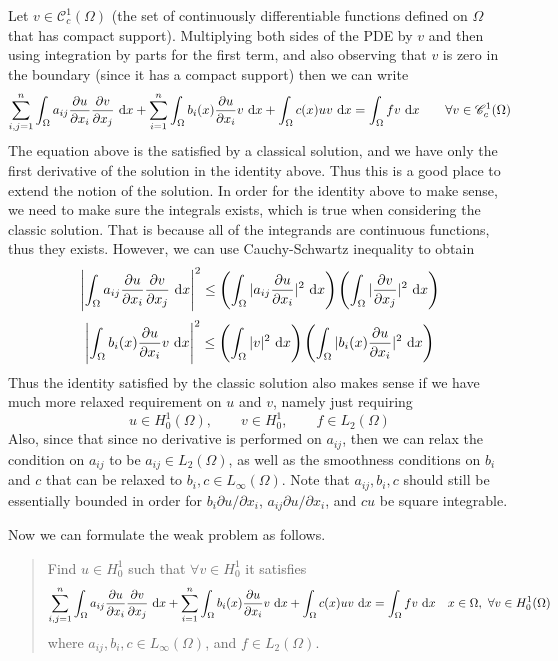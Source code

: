 Let $ v \in \mathscr{C}^1_c(\Omega) $ (the set of continuously differentiable functions defined on $ \Omega $ that has compact support). Multiplying both sides of the PDE by $ v $  and then using integration by parts for the first term, and also observing that $ v $ is zero in the boundary (since it has a compact support) then we can write
\[ \sum_{i,j=1}^{n}\int_\Omega a_{ij}\frac{\partial u}{\partial x_i} \frac{\partial v}{\partial x_j}\, \operatorname{d}\!x +\sum_{i=1}^{n} \int_\Omega b_i(x)\frac{\partial u}{\partial x_i} v\, \operatorname{d}\!x + \int_\Omega c(x) u v\, \operatorname{d}\!x = \int_\Omega fv\, \operatorname{d}\!x \qquad \forall v \in \mathscr{C}^1_c(\Omega) \]
The equation above is the satisfied by a classical solution, and we have only the first derivative of the solution in the identity above. Thus this is a good place to extend the notion of the solution. In order for the identity above to make sense, we need to make sure the integrals exists, which is true when considering the classic solution. That is because all of the integrands are continuous functions, thus they exists. However, we can use Cauchy-Schwartz inequality to obtain
\[\left|  \int_\Omega a_{ij}\frac{\partial u}{\partial x_i} \frac{\partial v}{\partial x_j}\, \operatorname{d}\!x  \right|^2 \leq \left(\int_\Omega |a_{ij}\frac{\partial u}{\partial x_i}|^2\, \operatorname{d}\!x\right)\left(\int_\Omega |\frac{\partial v}{\partial x_j}|^2\, \operatorname{d}\!x\right)\]
\[ \left| \int_\Omega b_i(x)\frac{\partial u}{\partial x_i} v \, \operatorname{d}\!x \right|^2 \leq \left(\int_\Omega |v|^2\, \operatorname{d}\!x\right)\left(\int_\Omega |b_i(x)\frac{\partial u}{\partial x_i}|^2 \, \operatorname{d}\!x\right) \]
Thus the identity satisfied by the classic solution also makes sense if we have much more relaxed requirement on $ u $ and $ v $, namely just requiring
\[ u \in H^1_0 (\Omega), \qquad v \in H^1_0, \qquad f \in L_2(\Omega) \]
Also, since that since no derivative is performed on $ a_{ij} $, then we can relax the condition on $ a_{ij} $ to be $ a_{ij} \in L_2(\Omega) $, as well as the smoothness conditions on $ b_i $ and $ c $ that can be relaxed to $ b_i, c \in L_\infty(\Omega) $. Note that $ a_{ij},b_i,c $ should still be essentially bounded in order for $ b_i \partial u/\partial x_i $, $ a_{ij}\partial u/\partial x_i $, and $ c u $ be square integrable.

\noindent Now we can formulate the weak problem as follows.
\begin{quote}
	Find $ u \in H_0^1 $ such that $ \forall v \in H_0^1 $ it satisfies
	\begin{align*}
		\sum_{i,j=1}^{n}\int_\Omega a_{ij}\frac{\partial u}{\partial x_i} \frac{\partial v}{\partial x_j}\, \operatorname{d}\!x +\sum_{i=1}^{n} \int_\Omega b_i(x) \frac{\partial u}{\partial x_i} v\, \operatorname{d}\!x + \int_\Omega c(x) u v\, \operatorname{d}\!x = \int_\Omega fv\, \operatorname{d}\!x \quad x\in \Omega,\ \forall v \in H_0^1(\Omega) 
	\end{align*}
	where $ a_{ij}, b_i, c \in L_\infty(\Omega) $, and $ f \in L_2(\Omega) $.
\end{quote}

